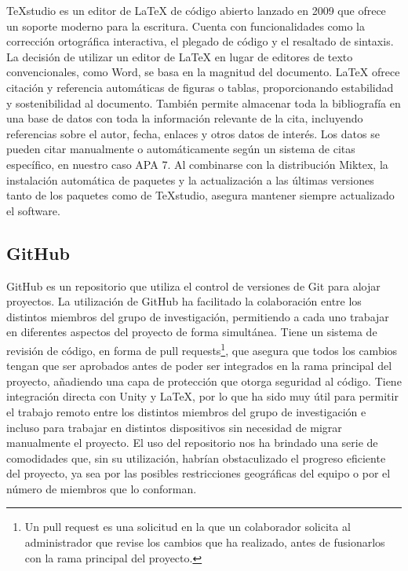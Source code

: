 TeXstudio es un editor de LaTeX de código abierto lanzado en 2009 que ofrece un soporte moderno para la escritura. Cuenta con funcionalidades como la corrección ortográfica interactiva, el plegado de código y el resaltado de sintaxis. La decisión de utilizar un editor de LaTeX en lugar de editores de texto convencionales, como Word, se basa en la magnitud del documento. LaTeX ofrece citación y referencia automáticas de figuras o tablas, proporcionando estabilidad y sostenibilidad al documento. También permite almacenar toda la bibliografía en una base de datos con toda la información relevante de la cita, incluyendo referencias sobre el autor, fecha, enlaces y otros datos de interés. Los datos se pueden citar manualmente o automáticamente según un sistema de citas específico, en nuestro caso APA 7. Al combinarse con la distribución Miktex, la instalación automática de paquetes y la actualización a las últimas versiones tanto de los paquetes como de TeXstudio, asegura mantener siempre actualizado el software.

\subsection{GitHub}

GitHub es un repositorio que utiliza el control de versiones de Git para alojar proyectos. La utilización de GitHub ha facilitado la colaboración entre los distintos miembros del grupo de investigación, permitiendo a cada uno trabajar en diferentes aspectos del proyecto de forma simultánea. Tiene un sistema de revisión de código, en forma de pull requests\footnote{Un pull request es una solicitud en la que un colaborador solicita al administrador que revise los cambios que ha realizado, antes de fusionarlos con la rama principal del proyecto.}, que asegura que todos los cambios tengan que ser aprobados antes de poder ser integrados en la rama principal del proyecto, añadiendo una capa de protección que otorga seguridad al código. Tiene integración directa con Unity y LaTeX, por lo que ha sido muy útil para permitir el trabajo remoto entre los distintos miembros del grupo de investigación e incluso para trabajar en distintos dispositivos sin necesidad de migrar manualmente el proyecto. El uso del repositorio nos ha brindado una serie de comodidades que, sin su utilización, habrían obstaculizado el progreso eficiente del proyecto, ya sea por las posibles restricciones geográficas del equipo o por el número de miembros que lo conforman.